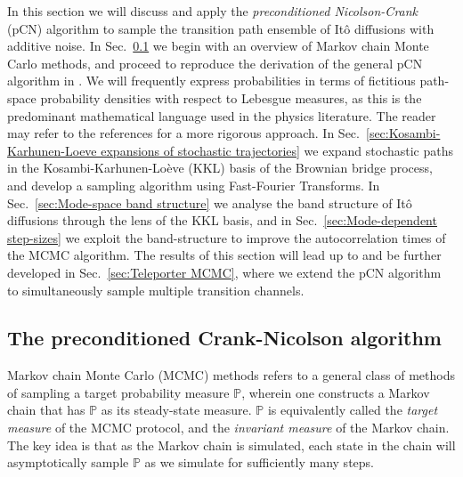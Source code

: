 In this section we will discuss and apply the \textit{preconditioned Nicolson-Crank} (pCN) algorithm to sample the transition path ensemble of It\^{o} diffusions with additive noise. In Sec.~\ref{sec:The preconditioned Crank-Nicolson algorithm} we begin with an overview of Markov chain Monte Carlo methods, and proceed to reproduce the derivation of the general pCN algorithm in \citep{cotterMCMCMethodsFunctions2013a, beskosMCMCMETHODSDIFFUSION2008a, hairerAnalysisSPDEsArising2005a, hairerAnalysisSPDEsArising2007a, hairerSpectralGapsMetropolis2014a}. We will frequently express probabilities in terms of fictitious path-space probability densities with respect to Lebesgue measures, as this is the predominant mathematical language used in the physics literature. The reader may refer to the references for a more rigorous approach. In Sec.~\ref{sec:Kosambi-Karhunen-Loeve expansions of stochastic trajectories} we expand stochastic paths in the Kosambi-Karhunen-Lo\`eve (KKL) basis of the Brownian bridge process, and develop a sampling algorithm using Fast-Fourier Transforms. In Sec.~\ref{sec:Mode-space band structure} we analyse the band structure of It\^{o} diffusions through the lens of the KKL basis, and in Sec.~\ref{sec:Mode-dependent step-sizes} we exploit the band-structure to improve the autocorrelation times of the MCMC algorithm. The results of this section will lead up to and be further developed in Sec.~\ref{sec:Teleporter MCMC}, where we extend the pCN algorithm to simultaneously sample multiple transition channels. 

\subsection{The preconditioned Crank-Nicolson algorithm} \label{sec:The preconditioned Crank-Nicolson algorithm}
 
Markov chain Monte Carlo (MCMC) methods refers to a general class of methods of sampling a target probability measure $\mathbb{P}$, wherein one constructs a Markov chain that has $\mathbb{P}$ as its steady-state measure. $\mathbb{P}$ is equivalently called the \textit{target measure} of the MCMC protocol, and the \textit{invariant measure} of the Markov chain. The key idea is that as the Markov chain is simulated, each state in the chain will asymptotically sample $\mathbb{P}$ as we simulate for sufficiently many steps.

